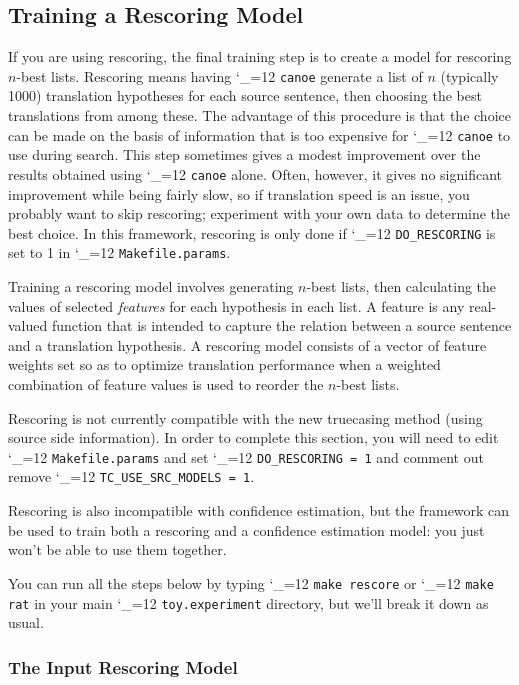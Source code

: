 \documentclass[11pt,letterpaper]{article}
\def\code{\begingroup\catcode`\_=12 \codex}
\newcommand{\codex}[1]{\texttt{#1}\endgroup}
\begin{document}
\subsection{Training a Rescoring Model} \label{RAT}

If you are using rescoring, the final training step is to create a model for
rescoring $n$-best lists.  Rescoring means having \code{canoe} generate a list
of $n$ (typically 1000) translation hypotheses for each source sentence, then
choosing the best translations from among these.  The advantage of this
procedure is that the choice can be made on the basis of information that is
too expensive for \code{canoe} to use during search. This step sometimes gives
a modest improvement over the results obtained using \code{canoe} alone. Often,
however, it gives no significant improvement while being fairly slow, so if
translation speed is an issue, you probably want to skip rescoring; experiment
with your own data to determine the best choice.  In this framework, rescoring
is only done if \code{DO_RESCORING} is set to 1 in \code{Makefile.params}.

Training a rescoring model involves generating $n$-best lists, then calculating
the values of selected \emph{features} for each hypothesis in each list. A
feature is any real-valued function that is intended to capture the relation
between a source sentence and a translation hypothesis. A rescoring model
consists of a vector of feature weights set so as to optimize translation
performance when a weighted combination of feature values is used to reorder
the $n$-best lists.

Rescoring is not currently compatible with the new truecasing method (using
source side information).  In order to complete this section, you will need to
edit \code{Makefile.params} and set \code{DO_RESCORING = 1} and comment out
remove \code{TC_USE_SRC_MODELS = 1}.

Rescoring is also incompatible with confidence estimation, but the framework
can be used to train both a rescoring and a confidence estimation model: you
just won't be able to use them together.

You can run all the steps below by typing \code{make rescore} or \code{make
rat} in your main \code{toy.experiment} directory, but we'll break it down as
usual.

\subsubsection{The Input Rescoring Model}
\end{document}

